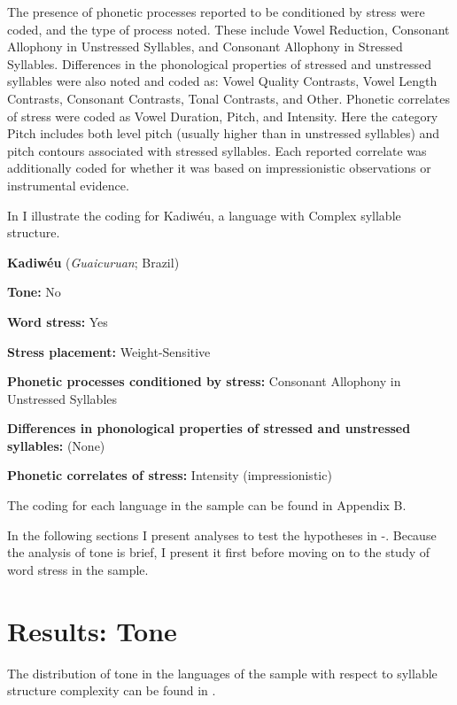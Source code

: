   The presence of phonetic processes reported to be conditioned by stress were coded, and the type of process noted. These include Vowel Reduction, Consonant Allophony in Unstressed Syllables, and Consonant Allophony in Stressed Syllables. Differences in the phonological properties of stressed and unstressed syllables were also noted and coded as: Vowel Quality Contrasts, Vowel Length Contrasts, Consonant Contrasts, Tonal Contrasts, and Other. Phonetic correlates of stress were coded as Vowel Duration, Pitch, and Intensity. Here the category Pitch includes both level pitch (usually higher than in unstressed syllables) and pitch contours associated with stressed syllables. Each reported correlate was additionally coded for whether it was based on impressionistic observations or instrumental evidence.

  In  I illustrate the coding for Kadiwéu, a language with Complex syllable structure.

\ea\label{ex:5.26}
  \textbf{Kadiwéu} (\textit{Guaicuruan}; Brazil)

\textbf{Tone:} No

\textbf{Word stress:} Yes

\textbf{Stress placement:} Weight-Sensitive

\textbf{Phonetic processes conditioned by stress:} Consonant Allophony in Unstressed Syllables

\textbf{Differences in phonological properties of stressed and unstressed syllables:} (None)

\textbf{Phonetic correlates of stress:} Intensity (impressionistic)
\z

The coding for each language in the sample can be found in Appendix B.

  In the following sections I present analyses to test the hypotheses in -. Because the analysis of tone is brief, I present it first before moving on to the study of word stress in the sample.

\section{Results: Tone}\label{sec:5.3}

  The distribution of tone in the languages of the sample with respect to syllable structure complexity can be found in .

